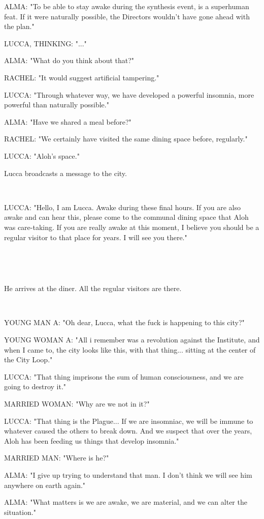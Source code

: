 \documentclass[11pt]{article}
\begin{document}
ALMA: "To be able to stay awake during the synthesis event, is a superhuman feat.
If it were naturally possible, the Directors wouldn't have gone ahead with the plan."

LUCCA, THINKING: "..."

ALMA: "What do you think about that?"

RACHEL: "It would suggest artificial tampering."

LUCCA: "Through whatever way, we have developed a powerful insomnia, more powerful than naturally possible."

ALMA: "Have we shared a meal before?"

RACHEL: "We certainly have visited the same dining space before, regularly."

LUCCA: "Aloh's space."

Lucca broadcasts a message to the city.

\ 

LUCCA: "Hello, I am Lucca. Awake during these final hours. 
If you are also awake and can hear this, please come to the communal dining space that Aloh was care-taking. 
If you are really awake at this moment, I believe you should be a regular visitor to that place for years.
I will see you there."

\ 

\ 

He arrives at the diner.
All the regular visitors are there. 

\ 

YOUNG MAN A: "Oh dear, Lucca, what the fuck is happening to this city?"

YOUNG WOMAN A: "All i remember was a revolution against the Institute, and when I came to, the city looks like this, with that thing... sitting at the center of the City Loop."

LUCCA: "That thing imprisons the sum of human consciousness, and we are going to destroy it."

MARRIED WOMAN: "Why are we not in it?"

LUCCA: "That thing is the Plague... If we are insomniac, we will be immune to whatever caused the others to break down.
And we suspect that over the years, Aloh has been feeding us things that develop insomnia."

MARRIED MAN: "Where is he?"

ALMA: "I give up trying to understand that man.
I don't think we will see him anywhere on earth again."

ALMA: "What matters is we are awake, we are material, and we can alter the situation."
\end{document}
